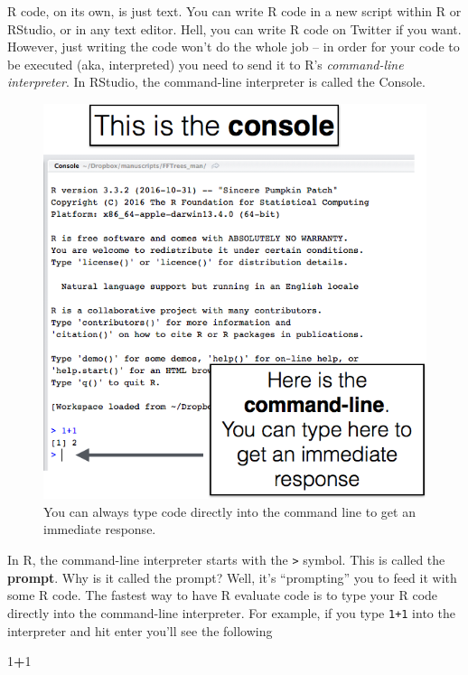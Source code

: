\documentclass[
]{book}
\newenvironment{Shaded}{\begin{snugshade}}{\end{snugshade}}
\newcommand{\DecValTok}[1]{\textcolor[rgb]{0.00,0.00,0.81}{#1}}
\newcommand{\OperatorTok}[1]{\textcolor[rgb]{0.81,0.36,0.00}{\textbf{#1}}}
\begin{document}
R code, on its own, is just text. You can write R code in a new script within R or RStudio, or in any text editor. Hell, you can write R code on Twitter if you want. However, just writing the code won't do the whole job -- in order for your code to be executed (aka, interpreted) you need to send it to R's \emph{command-line interpreter}. In RStudio, the command-line interpreter is called the Console.

\begin{figure}

{\centering \includegraphics[width=0.75\linewidth]{images/commandline} 

}

\caption{You can always type code directly into the command line to get an immediate response.}\label{fig:unnamed-chunk-3}
\end{figure}

In R, the command-line interpreter starts with the \texttt{\textgreater{}} symbol. This is called the \textbf{prompt}. Why is it called the prompt? Well, it's ``prompting'' you to feed it with some R code. The fastest way to have R evaluate code is to type your R code directly into the command-line interpreter. For example, if you type \texttt{1+1} into the interpreter and hit enter you'll see the following

\begin{Shaded}
\begin{Highlighting}[]
\DecValTok{1}\OperatorTok{+}\DecValTok{1}
\end{Highlighting}
\end{Shaded}
\end{document}
